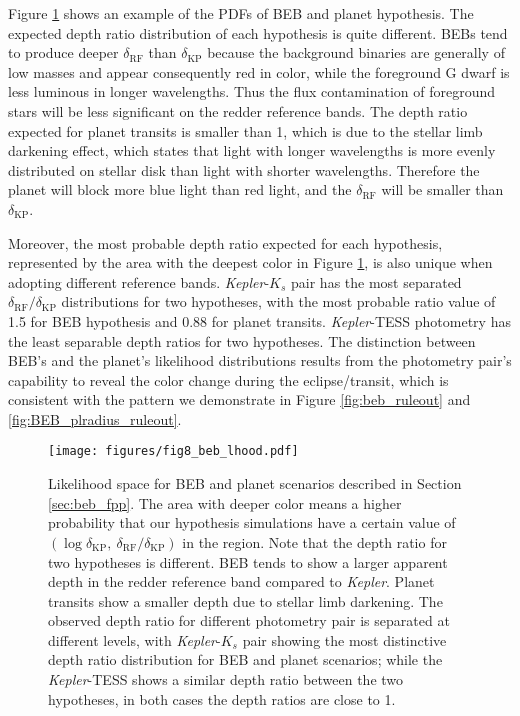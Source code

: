 \documentclass{aastex63}
\begin{document}
 Figure \ref{fig:beb_fpp_example} shows an example of the PDFs of BEB and planet hypothesis. The expected depth ratio distribution of each hypothesis is quite different. BEBs tend to produce deeper $\delta_\mathrm{RF}$ than $\delta_\mathrm{KP}$ because the background binaries are generally of low masses and appear consequently red in color, while the foreground G dwarf is less luminous in longer wavelengths. Thus the flux contamination of foreground stars will be less significant on the redder reference bands. The depth ratio expected for planet transits is smaller than 1, which is due to the stellar limb darkening effect, which states that light with longer wavelengths is more evenly distributed on stellar disk than light with shorter wavelengths. Therefore the planet will block more blue light than red light, and the $\delta_\mathrm{RF}$ will be smaller than $\delta_\mathrm{KP}$. 
    
 Moreover, the most probable depth ratio expected for each hypothesis, represented by the area with the deepest color in Figure \ref{fig:beb_fpp_example}, is also unique when adopting different reference bands. \emph{Kepler}-$K_s$ pair has the most separated $\delta_\mathrm{RF}/\delta_\mathrm{KP}$ distributions for two hypotheses, with the most probable ratio value of 1.5 for BEB hypothesis and 0.88 for planet transits. \emph{Kepler}-TESS photometry has the least separable depth ratios for two hypotheses. The distinction between BEB's and the planet's likelihood distributions results from the photometry pair's capability to reveal the color change during the eclipse/transit, which is consistent with the pattern we demonstrate in Figure \ref{fig:beb_ruleout} and \ref{fig:BEB_plradius_ruleout}.
 
 \begin{figure}[ht]
    \centering
    \texttt{[image: figures/fig8\_beb\_lhood.pdf]}
    \caption{Likelihood space for BEB and planet scenarios described in Section \ref{sec:beb_fpp}. The area with deeper color means a higher probability that our hypothesis simulations have a certain value of $(\log \delta_\mathrm{KP},~\delta_\mathrm{RF}/\delta_\mathrm{KP})$ in the region. Note that the depth ratio for two hypotheses is different. BEB tends to show a larger apparent depth in the redder reference band compared to \emph{Kepler}. Planet transits show a smaller depth due to stellar limb darkening. The observed depth ratio for different photometry pair is separated at different levels, with \emph{Kepler}-$K_s$ pair showing the most distinctive depth ratio distribution for BEB and planet scenarios; while the \emph{Kepler}-TESS shows a similar depth ratio between the two hypotheses, in both cases the depth ratios are close to 1.}
    \label{fig:beb_fpp_example}
\end{figure}
 
\end{document}
